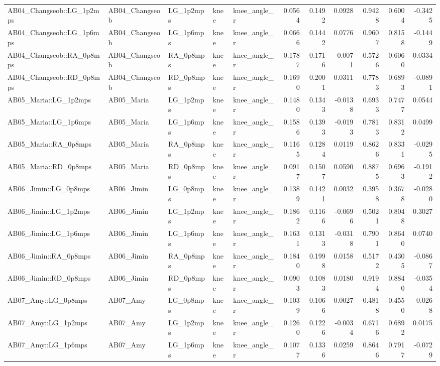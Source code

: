 \begin{table}
\begin{tabular}{lllllrrrrrr}
AB04_Changseob::LG_1p2mps & AB04_Changseob & LG_1p2mps & knee & knee_angle_r & 0.0564 & 0.1492 & 0.0928 & 0.9428 & 0.6004 & -0.3425 \\
AB04_Changseob::LG_1p6mps & AB04_Changseob & LG_1p6mps & knee & knee_angle_r & 0.0666 & 0.1442 & 0.0776 & 0.9607 & 0.8158 & -0.1449 \\
AB04_Changseob::RA_0p8mps & AB04_Changseob & RA_0p8mps & knee & knee_angle_r & 0.1787 & 0.1716 & -0.0071 & 0.5726 & 0.6060 & 0.0334 \\
AB04_Changseob::RD_0p8mps & AB04_Changseob & RD_0p8mps & knee & knee_angle_r & 0.1690 & 0.2001 & 0.0311 & 0.7783 & 0.6893 & -0.0891 \\
AB05_Maria::LG_1p2mps & AB05_Maria & LG_1p2mps & knee & knee_angle_r & 0.1480 & 0.1343 & -0.0138 & 0.6933 & 0.7477 & 0.0544 \\
AB05_Maria::LG_1p6mps & AB05_Maria & LG_1p6mps & knee & knee_angle_r & 0.1586 & 0.1393 & -0.0193 & 0.7813 & 0.8312 & 0.0499 \\
AB05_Maria::RA_0p8mps & AB05_Maria & RA_0p8mps & knee & knee_angle_r & 0.1165 & 0.1284 & 0.0119 & 0.8626 & 0.8331 & -0.0295 \\
AB05_Maria::RD_0p8mps & AB05_Maria & RD_0p8mps & knee & knee_angle_r & 0.0917 & 0.1507 & 0.0590 & 0.8875 & 0.6963 & -0.1912 \\
AB06_Jimin::LG_0p8mps & AB06_Jimin & LG_0p8mps & knee & knee_angle_r & 0.1389 & 0.1421 & 0.0032 & 0.3958 & 0.3678 & -0.0280 \\
AB06_Jimin::LG_1p2mps & AB06_Jimin & LG_1p2mps & knee & knee_angle_r & 0.1862 & 0.1166 & -0.0696 & 0.5021 & 0.8048 & 0.3027 \\
AB06_Jimin::LG_1p6mps & AB06_Jimin & LG_1p6mps & knee & knee_angle_r & 0.1631 & 0.1313 & -0.0318 & 0.7901 & 0.8640 & 0.0740 \\
AB06_Jimin::RA_0p8mps & AB06_Jimin & RA_0p8mps & knee & knee_angle_r & 0.1840 & 0.1998 & 0.0158 & 0.5172 & 0.4305 & -0.0867 \\
AB06_Jimin::RD_0p8mps & AB06_Jimin & RD_0p8mps & knee & knee_angle_r & 0.0903 & 0.1083 & 0.0180 & 0.9194 & 0.8840 & -0.0354 \\
AB07_Amy::LG_0p8mps & AB07_Amy & LG_0p8mps & knee & knee_angle_r & 0.1039 & 0.1066 & 0.0027 & 0.4818 & 0.4550 & -0.0268 \\
AB07_Amy::LG_1p2mps & AB07_Amy & LG_1p2mps & knee & knee_angle_r & 0.1260 & 0.1226 & -0.0034 & 0.6716 & 0.6892 & 0.0175 \\
AB07_Amy::LG_1p6mps & AB07_Amy & LG_1p6mps & knee & knee_angle_r & 0.1077 & 0.1336 & 0.0259 & 0.8646 & 0.7917 & -0.0729 \\

\end{tabular}
\end{table}

